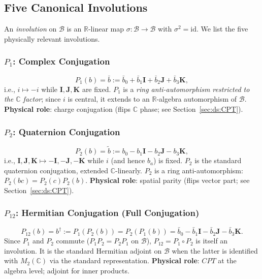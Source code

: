 \documentclass[12pt,a4paper]{article}
\theoremstyle{definition}
\theoremstyle{remark}
\begin{document}
\subsection{Five Canonical Involutions}
\label{sec:ds:involutions}

An \emph{involution} on $\mathcal{B}$ is an $\mathbb{R}$-linear map
$\sigma:\mathcal{B}\to\mathcal{B}$ with $\sigma^2=\mathrm{id}$.
We list the five physically relevant involutions.

\subsubsection{$P_1$: Complex Conjugation}
\begin{equation}
  P_1(b) = \bar{b} := \bar{b}_0 + \bar{b}_1\mathbf{I}
            + \bar{b}_2\mathbf{J} + \bar{b}_3\mathbf{K},
  \label{eq:ds:P1}
\end{equation}
i.e., $i\mapsto -i$ while $\mathbf{I},\mathbf{J},\mathbf{K}$ are fixed.
$P_1$ is a \emph{ring anti-automorphism restricted to the $\mathbb{C}$ factor};
since $i$ is central, it extends to an $\mathbb{R}$-algebra automorphism
of $\mathcal{B}$.
\textbf{Physical role}: charge conjugation (flips $\mathbb{C}$ phase; see
Section~\ref{sec:ds:CPT}).

\subsubsection{$P_2$: Quaternion Conjugation}
\begin{equation}
  P_2(b) = \tilde{b} := b_0 - b_1\mathbf{I} - b_2\mathbf{J} - b_3\mathbf{K},
  \label{eq:ds:P2}
\end{equation}
i.e., $\mathbf{I},\mathbf{J},\mathbf{K}\mapsto -\mathbf{I},-\mathbf{J},-\mathbf{K}$
while $i$ (and hence $b_a$) is fixed.
$P_2$ is the standard quaternion conjugation, extended $\mathbb{C}$-linearly.
$P_2$ is a ring anti-automorphism: $P_2(bc)=P_2(c)P_2(b)$.
\textbf{Physical role}: spatial parity (flips vector part; see
Section~\ref{sec:ds:CPT}).

\subsubsection{$P_{12}$: Hermitian Conjugation (Full Conjugation)}
\begin{equation}
  P_{12}(b) = b^\dagger := P_1(P_2(b)) = P_2(P_1(b))
  = \bar{b}_0 - \bar{b}_1\mathbf{I} - \bar{b}_2\mathbf{J} - \bar{b}_3\mathbf{K}.
  \label{eq:ds:P12}
\end{equation}
Since $P_1$ and $P_2$ commute ($P_1 P_2 = P_2 P_1$ on $\mathcal{B}$),
$P_{12} = P_1 \circ P_2$ is itself an involution.
It is the standard Hermitian adjoint on $\mathcal{B}$ when the latter is
identified with $M_{2}(\mathbb{C})$ via the standard representation.
\textbf{Physical role}: $CPT$ at the algebra level; adjoint for inner products.
\end{document}
